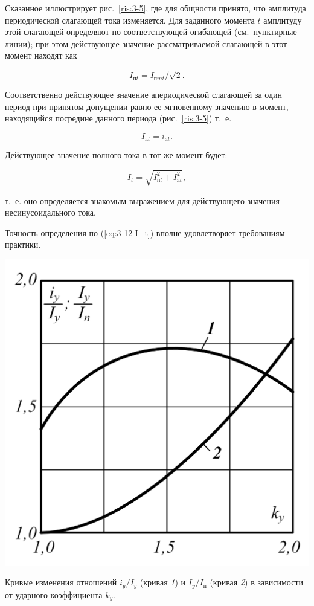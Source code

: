 Сказанное иллюстрирует рис.~\ref{ris:3-5}, где для общности принято, что амплитуда периодической слагающей тока изменяется. Для заданного момента $ t $ амплитуду этой слагающей определяют по соответствующей огибающей (см.~пунктирные линии); при этом действующее значение рассматриваемой слагающей в этот момент находят как

\begin{equation}
	I_{\text{п}t} = I_{\text{п}mt} / \sqrt{2}.
	\label{eq:3-10 I_nt}
\end{equation}

Соответственно действующее значение апериодической слагающей за один период при принятом допущении равно ее мгновенному значению в момент, находящийся посредине данного периода (рис.~\ref{ris:3-5}) т.~е.

\begin{equation}
	I_{\text{a}t} = i_{\text{a}t}.
	\label{eq:3-11 I_at}
\end{equation}

Действующее значение полного тока в тот же момент будет:

\begin{equation}
	I_t = \sqrt{I^2_{\text{п}t} + I^2_{\text{a}t}},
	\label{eq:3-12 I_t}
\end{equation}

т.~е. оно определяется знакомым выражением для действующего значения несинусоидального тока.

Точность определения по (\ref{eq:3-12 I_t}) вполне удовлетворяет требованиям практики.

\begin{floatingfigure}[rflt]{0.45\linewidth}
	\centering
	\includegraphics[width=0.43\linewidth]{pic/3-6}
	\caption{Кривые изменения отношений $ i_y / I_y $ (кривая \textit{1}) и $ I_y / I_{\text{п}} $ (кривая \textit{2}) в зависимости от ударного коэффициента $ k_y $.}
	\label{ris:3-6 I}
\end{floatingfigure}

